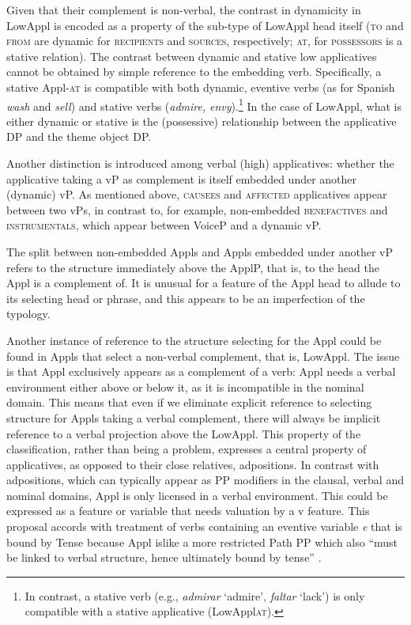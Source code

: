 \documentclass[output=paper,modfonts,nonflat]{langsci/langscibook}
\begin{document}
Given that their complement is non-verbal, the contrast in dynamicity in LowAppl is encoded as a property of the sub-type of LowAppl head itself (\textsc{to} and \textsc{from} are dynamic for \textsc{recipients} and \textsc{sources}, respectively; \textsc{at}, for \textsc{possessors} is a stative relation). The contrast between dynamic and stative low applicatives cannot be obtained by simple reference to the embedding verb. Specifically, a stative Appl-\textsc{at} is compatible with both dynamic, eventive verbs (as for Spanish \textit{wash} and \textit{sell}) and stative verbs (\textit{admire,} \textit{envy}).\footnote{In contrast, a stative verb (e.g., \textit{admirar} ‘admire’, \textit{faltar} ‘lack’) is only compatible with a stative applicative (LowAppl\textsc{at}).}  In the case of LowAppl, what is either dynamic or stative is the (possessive) relationship between the applicative DP and the theme object DP. 

Another distinction is introduced among verbal (high) applicatives: whether the applicative taking a vP as complement is itself embedded under another (dynamic) vP. As mentioned above, \textsc{causees} and \textsc{affected} applicatives appear between two vPs, in contrast to, for example, non-embedded \textsc{benefactives} and \textsc{instrumentals}, which appear between VoiceP and a dynamic vP. 

The split between non-embedded Appls and Appls embedded under another vP refers to the structure immediately above the ApplP, that is, to the head the Appl is a complement of. It is unusual for a feature of the Appl head to allude to its selecting head or phrase, and this appears to be an imperfection of the typology.  

Another instance of reference to the structure selecting for the Appl could be found in Appls that select a non-verbal complement, that is, LowAppl. The issue is that Appl exclusively appears as a complement of a verb: Appl needs a verbal environment either above or below it, as it is incompatible in the nominal domain.  This means that even if we eliminate explicit reference to selecting structure for Appls taking a verbal complement, there will always be implicit reference to a verbal projection above the LowAppl. This property of the classification, rather than being a problem, expresses a central property of applicatives, as opposed to their close relatives, adpositions. In contrast with adpositions, which can typically appear as PP modifiers in the clausal, verbal and nominal domains, Appl is only licensed in a verbal environment. This could be expressed as a feature or variable that needs valuation by a v feature. This proposal accords with  treatment of verbs containing an eventive variable \textit{e} that is bound by Tense because Appl islike a more restricted Path PP which also “must be linked to verbal structure, hence ultimately bound by tense” \citep[35]{Svenonious2007}. 
\end{document}
